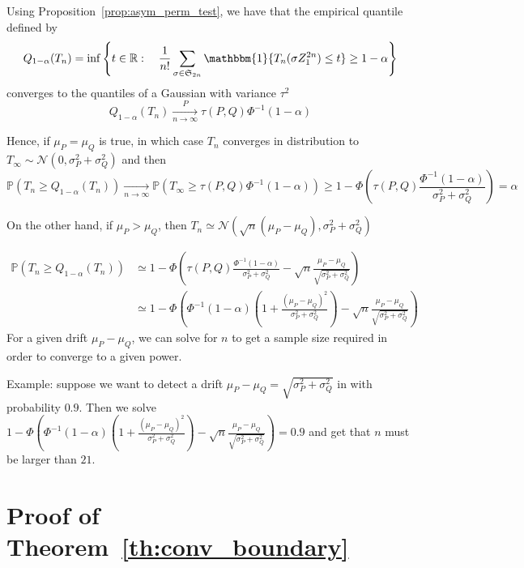 \documentclass{article}
\theoremstyle{plain}
\theoremstyle{remark}
\renewcommand{\P}{\mathbb{P}}
\newcommand{\R}{\mathbb{R}}
\renewcommand{\S}{\mathfrak{S}}
\newcommand{\1}{\mathbbm{1}}
\numberwithin{equation}{section}
\begin{document}
Using Proposition~\ref{prop:asym_perm_test}, we have that the empirical quantile defined by
$$Q_{1-\alpha}(T_n) = \inf\left\{t \in \R:\quad \frac{1}{n!}\sum_{\sigma \in \S_{2n}} \1\{T_n(\sigma Z_{1}^{2n}) \le t\} \ge 1-\alpha\right\} $$
converges to the quantiles of a Gaussian with variance $\tau^2$
$$Q_{1-\alpha}(T_n)\xrightarrow[n \to \infty]{P} \tau(P,Q)\Phi^{-1}(1-\alpha) $$

 Hence, if $\mu_P = \mu_Q$ is true, in which case $T_n$ converges in distribution to $T_\infty\sim \mathcal{N}(0,\sigma_P^2+\sigma_Q^2 )$ and then
$$\P\left( T_n \ge Q_{1-\alpha}(T_n)\right) \xrightarrow[n \to \infty]{} \P(T_\infty\ge \tau(P,Q)\Phi^{-1}(1-\alpha)) \ge  1-\Phi\left(\tau(P,Q)\frac{\Phi^{-1}(1-\alpha)}{\sigma_P^2+\sigma_Q^2 } \right)=\alpha  $$

On the other hand, if $\mu_P > \mu_Q$, then $T_n \simeq \mathcal{N}(\sqrt{n}(\mu_P-\mu_Q),\sigma_P^2+\sigma_Q^2 ) $

\begin{align*}
\P\left( T_n \ge Q_{1-\alpha}(T_n)\right)&\simeq  1-\Phi\left(\tau(P,Q)\frac{\Phi^{-1}(1-\alpha)}{\sigma_P^2+\sigma_Q^2 }-  \sqrt{n}\frac{\mu_P-\mu_Q}{\sqrt{\sigma_P^2+\sigma_Q^2}} \right)  \\
&\simeq  1-\Phi\left(\Phi^{-1}(1-\alpha)\left(1+\frac{(\mu_P-\mu_Q)^2}{\sigma_P^2+\sigma_Q^2 }\right)-  \sqrt{n}\frac{\mu_P-\mu_Q}{\sqrt{\sigma_P^2+\sigma_Q^2}} \right)
\end{align*}
For a given drift $\mu_P-\mu_Q$, we can solve for $n$ to get a sample size required in order to converge to a given power.

Example: suppose we want to detect a drift $\mu_P-\mu_Q=\sqrt{\sigma_P^2+\sigma_Q^2}$ in with probability $0.9$. Then we solve $1-\Phi\left(\Phi^{-1}(1-\alpha)\left(1+\frac{(\mu_P-\mu_Q)^2}{\sigma_P^2+\sigma_Q^2 }\right)-  \sqrt{n}\frac{\mu_P-\mu_Q}{\sqrt{\sigma_P^2+\sigma_Q^2}} \right) = 0.9$ and get that $n$ must be larger than $21$.
\section{Proof of Theorem~\ref{th:conv_boundary}}
\end{document}
